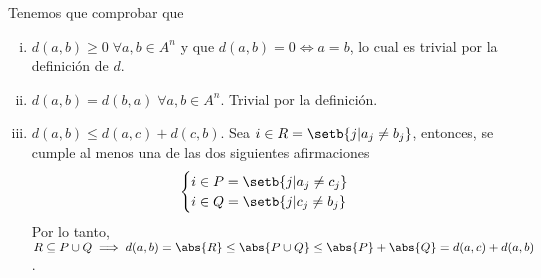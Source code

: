 \begin{eje}
    Tenemos que comprobar que 
    \begin{enumerate}[i)]
        \item $d(a,b) \geq 0 \; \forall a,b 
\in A^n$ y
        que $d(a,b) = 0 \iff a = b$, lo 
cual es trivial
        por la definición de $d$. \item 
$d(a,b) = d(b,a)
        \; \forall a,b \in A^n$. Trivial 
por la 
        definición. \item $d(a, b) \leq 
d(a,c) + d(c, 
        b)$. Sea $i \in R = \setb{j \vert 
a_j \neq 
        b_j}$, entonces, se cumple al menos 
una de las
        dos siguientes afirmaciones 
        \[
            
            \begin{cases}
                i \in P = 
                \setb{j \vert 
                a_j \neq c_j} \\
                i \in Q = 
                \setb{j \vert 
                c_j \neq b_j} 
            \end{cases}
            
        \]
        Por lo tanto, $R \subseteq P \cup Q 
\implies 
        d(a,b) = \abs{R} \leq \abs{P \cup 
Q} \leq 
        \abs{P} + \abs{Q} = d(a,c) + 
d(a,b)$. 
    \end{enumerate}
    
\end{eje}

